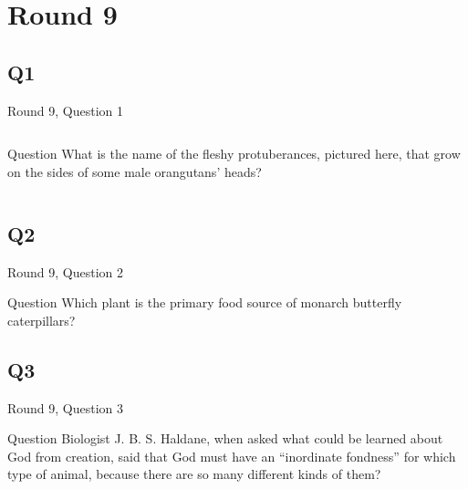 \documentclass[11pt]{beamer}
\begin{document}
\section{Round 9}
\subsection*{Q1}
\begin{frame}[t]{Round 9, Question 1}
\begin{columns}[T,totalwidth=\linewidth]
\begin{column}{0.32\linewidth}
\begin{block}{Question}
What is the name of the fleshy protuberances, pictured here, that grow on the sides of some male orangutans' heads?
\end{block}
\end{column}
\begin{column}{0.65\linewidth}
\begin{center}
\texttt{[image: \{Images/orangutan]}.jpg}
\end{center}
\end{column}
\end{columns}
\end{frame}
\subsection*{Q2}
\begin{frame}[t]{Round 9, Question 2}
\begin{block}{Question}
Which plant is the primary food source of monarch butterfly caterpillars?
\end{block}
\end{frame}
\subsection*{Q3}
\begin{frame}[t]{Round 9, Question 3}
\begin{block}{Question}
Biologist J. B. S. Haldane, when asked what could be learned about God from creation, said that God must have an ``inordinate fondness'' for which type of animal, because there are so many different kinds of them?
\end{block}
\end{frame}
\end{document}
